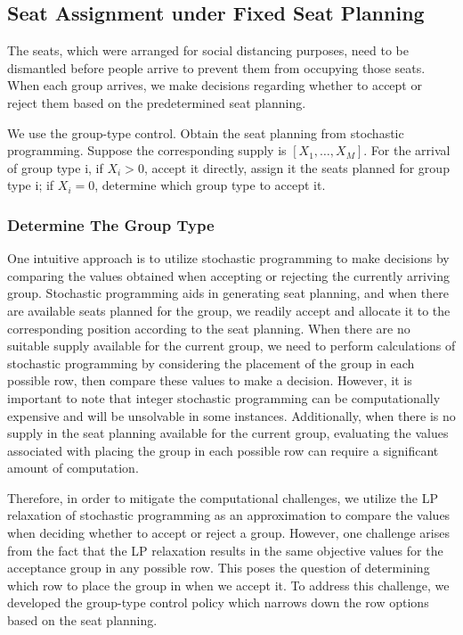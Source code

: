 \subsection{Seat Assignment under Fixed Seat Planning}
The seats, which were arranged for social distancing purposes, need to be dismantled
before people arrive to prevent them from occupying those seats. When each group
arrives, we make decisions regarding whether to accept or reject them based on the
predetermined seat planning.

We use the group-type control. Obtain the seat planning from stochastic programming. Suppose the
corresponding supply is $[X_1, \ldots, X_M]$. For the arrival of group type i, if $X_i > 0$, accept it directly, assign it the seats planned for group type i; if $X_i = 0$, determine which group type to accept it.

\subsubsection{Determine The Group Type}\label{nested_policy}
One intuitive approach is to utilize stochastic programming to make decisions by comparing the values obtained when accepting or rejecting the currently arriving group. Stochastic programming aids in generating seat planning, and when there are available seats planned for the group, we readily accept and allocate it to the corresponding position according to the seat planning. When there are no suitable supply available for the current group, we need to perform calculations of stochastic programming by considering the placement of the group in each possible row, then compare these values to make a decision. However, it is important to note that integer stochastic programming can be computationally expensive and will be unsolvable in some instances. Additionally, when there is no supply in the seat planning available for the current group, evaluating the values associated with placing the group in each possible row can require a significant amount of computation.

Therefore, in order to mitigate the computational challenges, we utilize the LP relaxation of stochastic programming as an approximation to compare the values when deciding whether to accept or reject a group. However, one challenge arises from the fact that the LP relaxation results in the same objective values for the acceptance group in any possible row. This poses the question of determining which row to place the group in when we accept it. To address this challenge, we developed the group-type control policy which narrows down the row options based on the seat planning.

